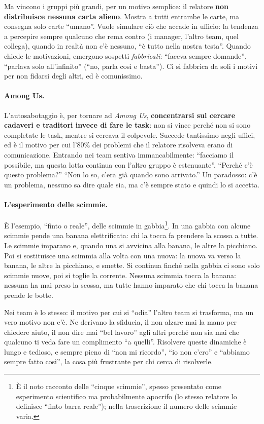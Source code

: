 Ma vincono i gruppi più grandi, per un motivo semplice: il relatore
\textbf{non distribuisce nessuna carta alieno}. Mostra a tutti entrambe le
carte, ma consegna solo carte ``umano''. Vuole simulare ciò che accade in
ufficio: la tendenza a percepire sempre qualcuno che rema contro (i manager,
l'altro team, quel collega), quando in realtà non c'è nessuno, ``è tutto nella
nostra testa''. Quando chiede le motivazioni, emergono sospetti
\emph{fabbricati}: ``faceva sempre domande'', ``parlava solo all'infinito''
(``no, parla così e basta''). Ci si fabbrica da soli i motivi per non fidarsi
degli altri, ed è comunissimo.

\paragraph{Among Us.} L'autosabotaggio è, per tornare ad \emph{Among Us},
\textbf{concentrarsi sul cercare cadaveri e traditori invece di fare le
task}: non si vince perché non si sono completate le task, mentre si cercava il
colpevole. Succede tantissimo negli uffici, ed è il motivo per cui l'80\% dei
problemi che il relatore risolveva erano di comunicazione. Entrando nei team
sentiva immancabilmente: ``facciamo il possibile, ma questa lotta continua con
l'altro gruppo è estenuante''. ``Perché c'è questo problema?'' ``Non lo so,
c'era già quando sono arrivato.'' Un paradosso: c'è un problema, nessuno sa
dire quale sia, ma c'è sempre stato e quindi lo si accetta.

\paragraph{L'esperimento delle scimmie.} È l'esempio, ``finto o reale'', delle
scimmie in gabbia\footnote{È il noto racconto delle ``cinque scimmie'', spesso
presentato come esperimento scientifico ma probabilmente apocrifo (lo stesso
relatore lo definisce ``finto barra reale''); nella trascrizione il numero
delle scimmie varia.}. In una gabbia con alcune scimmie pende una banana
elettrificata: chi la tocca fa prendere la scossa a tutte. Le scimmie imparano
e, quando una si avvicina alla banana, le altre la picchiano. Poi si
sostituisce una scimmia alla volta con una nuova: la nuova va verso la banana,
le altre la picchiano, e smette. Si continua finché nella gabbia ci sono solo
scimmie nuove, poi si toglie la corrente. Nessuna scimmia tocca la banana:
nessuna ha mai preso la scossa, ma tutte hanno imparato che chi tocca la
banana prende le botte.

Nei team è lo stesso: il motivo per cui si ``odia'' l'altro team si
trasforma, ma un vero motivo non c'è. Ne derivano la sfiducia, il non alzare
mai la mano per chiedere aiuto, il non dire mai ``bel lavoro'' agli altri
perché non sia mai che qualcuno ti veda fare un complimento ``a quelli''.
Risolvere queste dinamiche è lungo e tedioso, e sempre pieno di ``non mi
ricordo'', ``io non c'ero'' e ``abbiamo sempre fatto così'', la cosa più
frustrante per chi cerca di risolverle.


